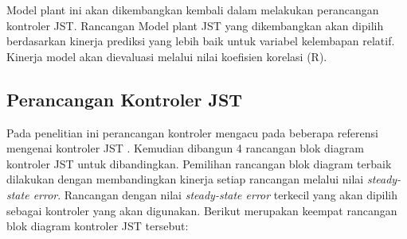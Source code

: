 Model plant ini akan dikembangkan kembali dalam melakukan perancangan kontroler JST. Rancangan Model plant JST yang dikembangkan akan dipilih berdasarkan kinerja prediksi yang lebih baik untuk variabel kelembapan relatif. Kinerja model akan dievaluasi melalui nilai koefisien korelasi (R).

\subsection{Perancangan Kontroler JST}
Pada penelitian ini perancangan kontroler mengacu pada beberapa referensi mengenai kontroler JST \cite{paper42Paisan}\cite{paper42LMa}\cite{paper42Hussain}. Kemudian dibangun 4 rancangan blok diagram kontroler JST untuk dibandingkan. Pemilihan rancangan blok diagram terbaik dilakukan dengan membandingkan kinerja setiap rancangan melalui nilai \textit{steady-state error}. Rancangan dengan nilai \textit{steady-state error} terkecil yang akan dipilih sebagai kontroler yang akan digunakan. Berikut merupakan keempat rancangan blok diagram kontroler JST tersebut:\\

